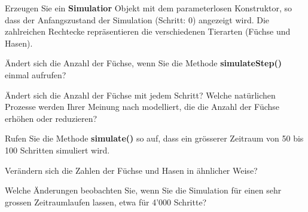 \begin{Exercise}[%
title={Verstehen der Simulation},
label={ex:simulation}]

    \begin{ExePart}
        Erzeugen Sie ein \textbf{Simulatior} Objekt mit dem parameterlosen
        Konstruktor, so dass der Anfangszustand der Simulation
        (Schritt: 0) angezeigt wird. Die zahlreichen Rechtecke repräsentieren
        die verschiedenen Tierarten (Füchse und Hasen).

        Ändert sich die Anzahl der Füchse, wenn Sie die Methode
        \textbf{simulateStep()} einmal aufrufen?
    \end{ExePart}


    \begin{ExePart}
        Ändert sich die Anzahl der Füchse mit jedem Schritt? Welche natürlichen
        Prozesse werden Ihrer Meinung nach modelliert, die die Anzahl der Füchse
        erhöhen oder reduzieren?
    \end{ExePart}


    \begin{ExePart}
        Rufen Sie die Methode \textbf{simulate()} so auf, dass ein grösserer
        Zeitraum von 50 bis 100 Schritten simuliert wird.

        Verändern sich die Zahlen der Füchse und Hasen in ähnlicher Weise?
    \end{ExePart}


    \begin{ExePart}
        Welche Änderungen beobachten Sie, wenn Sie die Simulation für einen sehr
        grossen Zeitraumlaufen lassen, etwa für 4'000 Schritte?
    \end{ExePart}

\end{Exercise}

